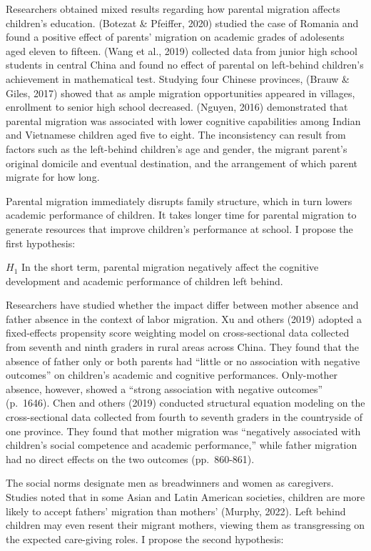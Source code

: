 \documentclass[
  man,floatsintext]{apa7}
\begin{document}
Researchers obtained mixed results regarding how parental migration affects children's education. (Botezat \& Pfeiffer, 2020) studied the case of Romania and found a positive effect of parents' migration on academic grades of adolesents aged eleven to fifteen. (Wang et al., 2019) collected data from junior high school students in central China and found no effect of parental on left-behind children's achievement in mathematical test. Studying four Chinese provinces, (Brauw \& Giles, 2017) showed that as ample migration opportunities appeared in villages, enrollment to senior high school decreased. (Nguyen, 2016) demonstrated that parental migration was associated with lower cognitive capabilities among Indian and Vietnamese children aged five to eight. The inconsistency can result from factors such as the left-behind children's age and gender, the migrant parent's original domicile and eventual destination, and the arrangement of which parent migrate for how long.

Parental migration immediately disrupts family structure, which in turn lowers academic performance of children. It takes longer time for parental migration to generate resources that improve children's performance at school. I propose the first hypothesis:

\(H_1\) In the short term, parental migration negatively affect the cognitive development and academic performance of children left behind.

Researchers have studied whether the impact differ between mother absence and father absence in the context of labor migration. Xu and others (2019) adopted a fixed-effects propensity score weighting model on cross-sectional data collected from seventh and ninth graders in rural areas across China. They found that the absence of father only or both parents had ``little or no association with negative outcomes'' on children's academic and cognitive performances. Only-mother absence, however, showed a ``strong association with negative outcomes'' (p.~1646). Chen and others (2019) conducted structural equation modeling on the cross-sectional data collected from fourth to seventh graders in the countryside of one province. They found that mother migration was ``negatively associated with children's social competence and academic performance,'' while father migration had no direct effects on the two outcomes (pp.~860-861).

The social norms designate men as breadwinners and women as caregivers. Studies noted that in some Asian and Latin American societies, children are more likely to accept fathers' migration than mothers' (Murphy, 2022). Left behind children may even resent their migrant mothers, viewing them as transgressing on the expected care-giving roles. I propose the second hypothesis:
\end{document}
